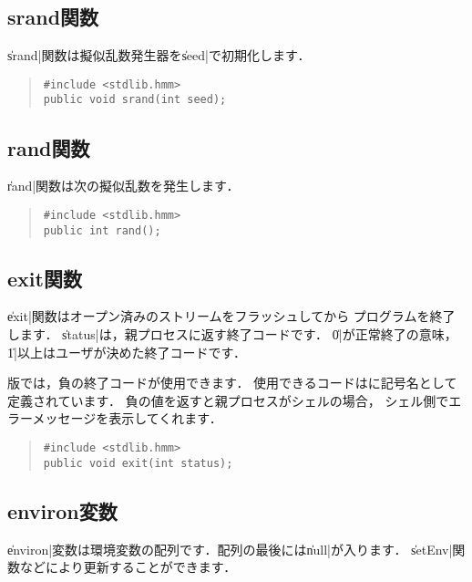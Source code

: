 \subsection{srand関数}

\|srand|関数は擬似乱数発生器を\|seed|で初期化します．

\begin{quote}
\begin{verbatim}
#include <stdlib.hmm>
public void srand(int seed);
\end{verbatim}
\end{quote}

\subsection{rand関数}

\|rand|関数は次の擬似乱数を発生します．

\begin{quote}
\begin{verbatim}
#include <stdlib.hmm>
public int rand();
\end{verbatim}
\end{quote}

\subsection{exit関数}

\|exit|関数はオープン済みのストリームをフラッシュしてから
プログラムを終了します．
\|status|は，親プロセスに返す終了コードです．
\|0|が正常終了の意味，\|1|以上はユーザが決めた終了コードです．

{\tacos}版では，負の終了コードが使用できます．
使用できるコードはに記号名として定義されています．
負の値を返すと親プロセスがシェルの場合，
シェル側でエラーメッセージを表示してくれます．

\begin{quote}
\begin{verbatim}
#include <stdlib.hmm>
public void exit(int status);
\end{verbatim}
\end{quote}

\subsection{environ変数}

\|environ|変数は環境変数の配列です．配列の最後には\|null|が入ります．
\|setEnv|関数などにより更新することができます．

